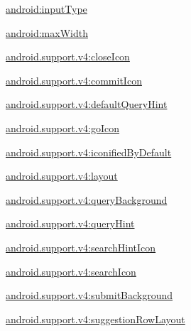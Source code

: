 {\ttfamily \hyperlink{classandroid_1_1support_1_1v4_1_1R_1_1styleable_afedfd4965c66397606be2ed3d76fe9c0}{android\+:input\+Type}}

{\ttfamily \hyperlink{classandroid_1_1support_1_1v4_1_1R_1_1styleable_aa1fcd209f07b6bb82802f5b87852f157}{android\+:max\+Width}}

{\ttfamily \hyperlink{classandroid_1_1support_1_1v4_1_1R_1_1styleable_af517a70a4f7a1112d44a394839d8ffaf}{android.\+support.\+v4\+:close\+Icon}}

{\ttfamily \hyperlink{classandroid_1_1support_1_1v4_1_1R_1_1styleable_a249a336fa30e7f77fa15e369b5db4e59}{android.\+support.\+v4\+:commit\+Icon}}

{\ttfamily \hyperlink{classandroid_1_1support_1_1v4_1_1R_1_1styleable_a0dba0574ce30d30bc8ac0941fe674251}{android.\+support.\+v4\+:default\+Query\+Hint}}

{\ttfamily \hyperlink{classandroid_1_1support_1_1v4_1_1R_1_1styleable_a4650e52ef5aadf8f43fe5a614b055cc4}{android.\+support.\+v4\+:go\+Icon}}

{\ttfamily \hyperlink{classandroid_1_1support_1_1v4_1_1R_1_1styleable_a417d0b0a020ec93e98525e018b21b07a}{android.\+support.\+v4\+:iconified\+By\+Default}}

{\ttfamily \hyperlink{classandroid_1_1support_1_1v4_1_1R_1_1styleable_a2df4c8970df3d39b8fca7d3605a3ac4d}{android.\+support.\+v4\+:layout}}

{\ttfamily \hyperlink{classandroid_1_1support_1_1v4_1_1R_1_1styleable_ac2a79ceebc50d310a3dbad7676afab25}{android.\+support.\+v4\+:query\+Background}}

{\ttfamily \hyperlink{classandroid_1_1support_1_1v4_1_1R_1_1styleable_a2094501d783cc294675c58b0b5ef484a}{android.\+support.\+v4\+:query\+Hint}}

{\ttfamily \hyperlink{classandroid_1_1support_1_1v4_1_1R_1_1styleable_a061d67b6fc4b4b493ef5993fa1bcf0ce}{android.\+support.\+v4\+:search\+Hint\+Icon}}

{\ttfamily \hyperlink{classandroid_1_1support_1_1v4_1_1R_1_1styleable_ab225bc2b5b5cdc07178516697d75824e}{android.\+support.\+v4\+:search\+Icon}}

{\ttfamily \hyperlink{classandroid_1_1support_1_1v4_1_1R_1_1styleable_ad5c34c512b8b52cc4e15a14f900ed036}{android.\+support.\+v4\+:submit\+Background}}

{\ttfamily \hyperlink{classandroid_1_1support_1_1v4_1_1R_1_1styleable_a8f88c91f413bd187e3c108b18f21cd8c}{android.\+support.\+v4\+:suggestion\+Row\+Layout}}

